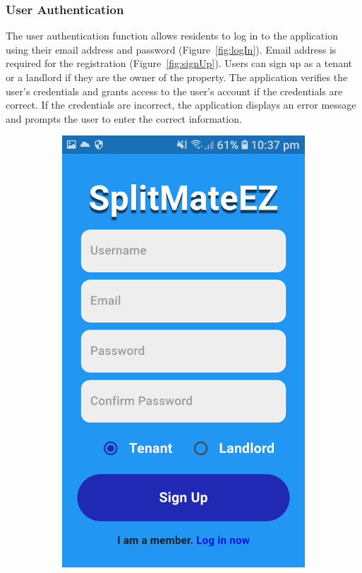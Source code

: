 \documentclass[sigconf]{acmart}
\begin{document}
\subsubsection{User Authentication}
The user authentication function allows residents to log in to the application using their email address and password (Figure~\ref{fig:logIn}). Email address is required for the registration (Figure~\ref{fig:signUp}). Users can sign up as a tenant or a landlord if they are the owner of the property.
The application verifies the user's credentials and grants access to the user's account if the credentials are correct. If the credentials are incorrect, the application displays an error message and prompts the user to enter the correct information.
\begin{figure}[h]
  \centering
  \begin{subfigure}{0.24\textwidth}
    \raggedright
    \includegraphics[width=\linewidth]{signUp.jpg}

\end{subfigure}
\end{figure}
\end{document}

